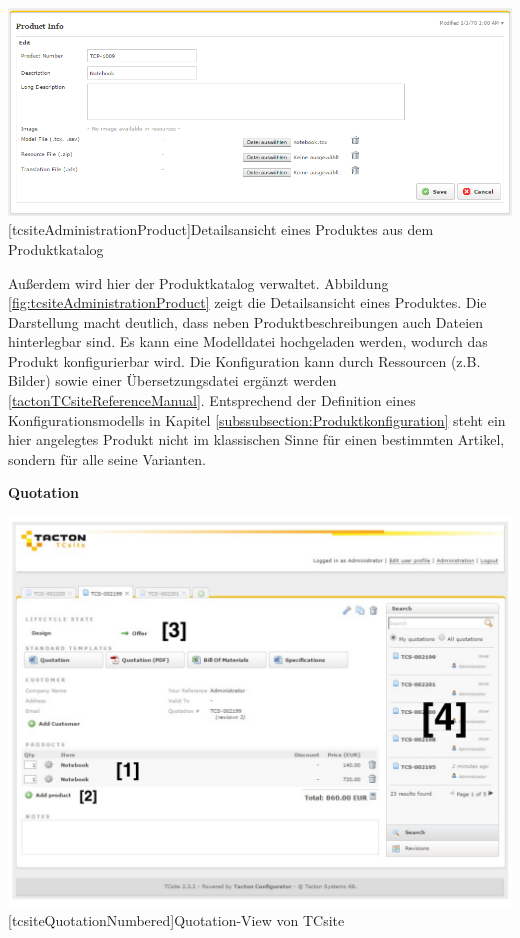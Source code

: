 \documentclass[12pt,a4paper,bibliography=totocnumbered,listof=totoc]{scrartcl}
\begin{document}
\vspace{1em}
\begin{minipage}{\linewidth}
	\centering
	\includegraphics[width=0.6\linewidth]{Abbildungen/tcsiteAdministrationProduct.PNG}
	[tcsiteAdministrationProduct]{Detailsansicht eines Produktes aus dem Produktkatalog}
	\label{fig:tcsiteAdministrationProduct}
\end{minipage}
\vspace{1em}

Außerdem wird hier der Produktkatalog verwaltet. Abbildung \ref{fig:tcsiteAdministrationProduct} zeigt die Detailsansicht eines Produktes. Die Darstellung macht deutlich, dass neben Produktbeschreibungen auch Dateien hinterlegbar sind. Es kann eine Modelldatei hochgeladen werden, wodurch das Produkt konfigurierbar wird. Die Konfiguration kann durch Ressourcen (z.B. Bilder) sowie einer Übersetzungsdatei ergänzt werden \ref{tactonTCsiteReferenceManual}. Entsprechend der Definition eines Konfigurationsmodells in Kapitel \ref{subssubsection:Produktkonfiguration} steht ein hier angelegtes Produkt nicht im klassischen Sinne für einen bestimmten Artikel, sondern für alle seine Varianten.

\textbf{Quotation}\\
\vspace{1em}
\begin{minipage}{\linewidth}
	\centering
	\includegraphics[width=0.7\linewidth]{Abbildungen/tcsiteQuotationNumbered.pdf}
	[tcsiteQuotationNumbered]{Quotation-View von TCsite}
	\label{fig:tcsiteQuotationNumbered}
\end{minipage}
\vspace{1em}
\end{document}
